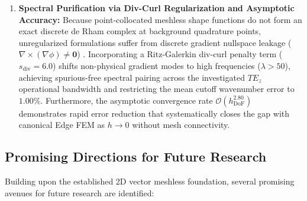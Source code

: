 \documentclass[preprint,12pt]{elsarticle}
\begin{document}
\begin{enumerate}
    \item \textbf{Spectral Purification via Div-Curl Regularization and Asymptotic Accuracy:} 
    Because point-collocated meshless shape functions do not form an exact discrete de Rham complex at background quadrature points, unregularized formulations suffer from discrete gradient nullspace leakage ($\nabla \times (\nabla \phi) \neq \mathbf{0}$) \cite{monk2003finite, bossavit1990spurious}. Incorporating a Ritz-Galerkin div-curl penalty term ($s_{\mathrm{div}} = 6.0$) shifts non-physical gradient modes to high frequencies ($\lambda > 50$), achieving spurious-free spectral pairing across the investigated $TE_z$ operational bandwidth and restricting the mean cutoff wavenumber error to $1.00\%$. Furthermore, the asymptotic convergence rate $\mathcal{O}(h_{\mathrm{DoF}}^{2.80})$ demonstrates rapid error reduction that systematically closes the gap with canonical Edge FEM as $h \to 0$ without mesh connectivity.
\end{enumerate}

\subsection{Promising Directions for Future Research}
\label{subsec:future_works}

Building upon the established 2D vector meshless foundation, several promising avenues for future research are identified:
\end{document}
